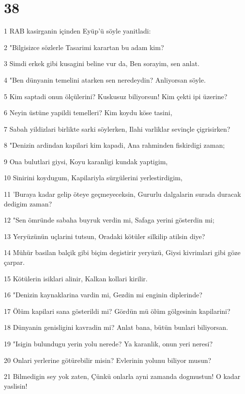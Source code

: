 \chapter{38}

\par 1 RAB kasirganin içinden Eyüp'ü söyle yanitladi:
\par 2 "Bilgisizce sözlerle Tasarimi karartan bu adam kim?
\par 3 Simdi erkek gibi kusagini beline vur da, Ben sorayim, sen anlat.
\par 4 "Ben dünyanin temelini atarken sen neredeydin? Anliyorsan söyle.
\par 5 Kim saptadi onun ölçülerini? Kuskusuz biliyorsun! Kim çekti ipi üzerine?
\par 6 Neyin üstüne yapildi temelleri? Kim koydu köse tasini,
\par 7 Sabah yildizlari birlikte sarki söylerken, Ilahi varliklar sevinçle çigrisirken?
\par 8 "Denizin ardindan kapilari kim kapadi, Ana rahminden fiskirdigi zaman;
\par 9 Ona bulutlari giysi, Koyu karanligi kundak yaptigim,
\par 10 Sinirini koydugum, Kapilariyla sürgülerini yerlestirdigim,
\par 11 'Buraya kadar gelip öteye geçmeyeceksin, Gururlu dalgalarin surada duracak dedigim zaman?
\par 12 "Sen ömründe sabaha buyruk verdin mi, Safaga yerini gösterdin mi;
\par 13 Yeryüzünün uçlarini tutsun, Oradaki kötüler silkilip atilsin diye?
\par 14 Mühür basilan balçik gibi biçim degistirir yeryüzü, Giysi kivrimlari gibi göze çarpar.
\par 15 Kötülerin isiklari alinir, Kalkan kollari kirilir.
\par 16 "Denizin kaynaklarina vardin mi, Gezdin mi enginin diplerinde?
\par 17 Ölüm kapilari sana gösterildi mi? Gördün mü ölüm gölgesinin kapilarini?
\par 18 Dünyanin genisligini kavradin mi? Anlat bana, bütün bunlari biliyorsan.
\par 19 "Isigin bulundugu yerin yolu nerede? Ya karanlik, onun yeri neresi?
\par 20 Onlari yerlerine götürebilir misin? Evlerinin yolunu biliyor musun?
\par 21 Bilmedigin sey yok zaten, Çünkü onlarla ayni zamanda dogmustun! O kadar yaslisin!
